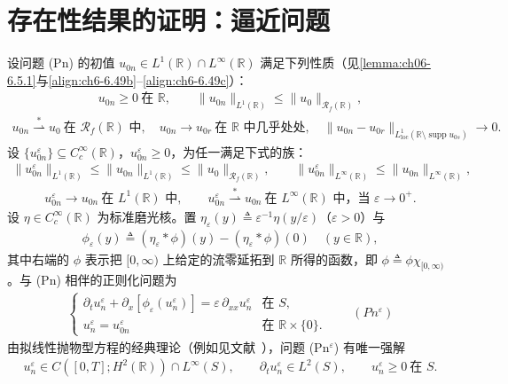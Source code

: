 ﻿\documentclass[../../main.tex]{subfiles}%
\begin{document}
\section{存在性结果的证明：逼近问题}\label{section:ch07-逼近问题}

设问题 (Pn) 的初值 $u_{0n}\in L^1(\mathbb{R})\cap L^\infty(\mathbb{R})$ 满足下列性质（见\cref{lemma:ch06-6.5.1}与\eqref{align:ch6-6.49b}--\eqref{align:ch6-6.49c}）：
\begin{align}
u_{0n}\geqslant0\ \text{在 }\mathbb{R},\qquad
\|u_{0n}\|_{L^1(\mathbb{R})}\leqslant\|u_0\|_{\mathscr{R}_f(\mathbb{R})}, \label{align:ch07-7.44}
\end{align}
\begin{align}
u_{0n}\stackrel{*}{\rightharpoonup}u_0\ \text{在 }\mathscr{R}_f(\mathbb{R})\text{ 中},\quad
u_{0n}\to u_{0r}\ \text{在 }\mathbb{R}\text{ 中几乎处处},\quad
\|u_{0n}-u_{0r}\|_{L^1_{\mathrm{loc}}(\mathbb{R}\setminus\operatorname{supp}u_{0s})}\to0. \label{align:ch07-7.45}
\end{align}
设 $\{u_{0n}^\varepsilon\}\subseteq C^\infty_c(\mathbb{R})$，$u_{0n}^\varepsilon\geqslant0$，为任一满足下式的族：
\begin{align}
\|u_{0n}^\varepsilon\|_{L^1(\mathbb{R})}\leqslant\|u_{0n}\|_{L^1(\mathbb{R})}\leqslant\|u_0\|_{\mathscr{R}_f(\mathbb{R})},\qquad
\|u_{0n}^\varepsilon\|_{L^\infty(\mathbb{R})}\leqslant\|u_{0n}\|_{L^\infty(\mathbb{R})}, \label{align:ch07-7.46}
\end{align}
\begin{align}
u_{0n}^\varepsilon\to u_{0n}\ \text{在 }L^1(\mathbb{R})\text{ 中},\qquad
u_{0n}^\varepsilon\stackrel{*}{\rightharpoonup}u_{0n}\ \text{在 }L^\infty(\mathbb{R})\text{ 中，当 }\varepsilon\to0^+. \label{align:ch07-7.47}
\end{align}
设 $\eta\in C^\infty_c(\mathbb{R})$ 为标准磨光核。置 $\eta_\varepsilon(y)\triangleq\varepsilon^{-1}\eta(y/\varepsilon)$（$\varepsilon>0$）与
\begin{align}
\phi_\varepsilon(y)\triangleq(\eta_\varepsilon*\phi)(y)-(\eta_\varepsilon*\phi)(0)\quad(y\in\mathbb{R}), \label{align:ch07-7.48}
\end{align}
其中右端的 $\phi$ 表示把 $[0,\infty)$ 上给定的流零延拓到 $\mathbb{R}$ 所得的函数，即 $\phi\triangleq\phi\chi_{[0,\infty)}$。与 (Pn) 相伴的正则化问题为
\begin{align*}
\begin{cases}
\partial_t u_n^\varepsilon+\partial_x[\phi_\varepsilon(u_n^\varepsilon)]=\varepsilon\,\partial_{xx}u_n^\varepsilon & \text{在 }S,\\
u_n^\varepsilon=u_{0n}^\varepsilon & \text{在 }\mathbb{R}\times\{0\}.
\end{cases}
\qquad(Pn^\varepsilon)
\end{align*}
由拟线性抛物型方程的经典理论（例如见文献~\cite{ref68}），问题 (Pn$^\varepsilon$) 有唯一强解
\begin{align*}
u_n^\varepsilon\in C([0,T];H^2(\mathbb{R}))\cap L^\infty(S),\qquad \partial_t u_n^\varepsilon\in L^2(S),\qquad u_n^\varepsilon\geqslant0\ \text{在 }S.
\end{align*}
\end{document}
